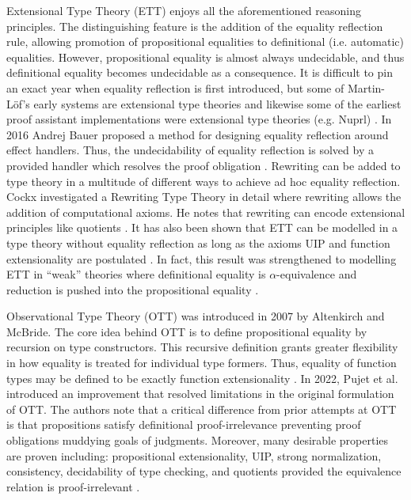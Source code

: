 Extensional Type Theory (ETT) enjoys all the aforementioned reasoning principles.
The distinguishing feature is the addition of the equality reflection rule, allowing promotion of propositional equalities to definitional (i.e. automatic) equalities.
However, propositional equality is almost always undecidable, and thus definitional equality becomes undecidable as a consequence.
It is difficult to pin an exact year when equality reflection is first introduced, but some of Martin-L\"{o}f's early systems are extensional type theories and likewise some of the earliest proof assistant implementations were extensional type theories (e.g. Nuprl) \cite{constable1986}.
In 2016 Andrej Bauer proposed a method for designing equality reflection around effect handlers.
Thus, the undecidability of equality reflection is solved by a provided handler which resolves the proof obligation \cite{bauer2016}.
Rewriting can be added to type theory in a multitude of different ways to achieve ad hoc equality reflection.
Cockx investigated a Rewriting Type Theory in detail where rewriting allows the addition of computational axioms.
He notes that rewriting can encode extensional principles like quotients \cite{cockx2020, cockx2021}.
It has also been shown that ETT can be modelled in a type theory without equality reflection as long as the axioms UIP and function extensionality are postulated \cite{winterhalter2019}.
In fact, this result was strengthened to modelling ETT in ``weak'' theories where definitional equality is $\alpha$-equivalence and reduction is pushed into the propositional equality \cite{boulier2019}.

Observational Type Theory (OTT) was introduced in 2007 by Altenkirch and McBride.
The core idea behind OTT is to define propositional equality by recursion on type constructors.
This recursive definition grants greater flexibility in how equality is treated for individual type formers.
Thus, equality of function types may be defined to be exactly function extensionality \cite{altenkirch2007}.
In 2022, Pujet et al. introduced an improvement that resolved limitations in the original formulation of OTT.
The authors note that a critical difference from prior attempts at OTT is that propositions satisfy definitional proof-irrelevance preventing proof obligations muddying goals of judgments.
Moreover, many desirable properties are proven including: propositional extensionality, UIP, strong normalization, consistency, decidability of type checking, and quotients provided the equivalence relation is proof-irrelevant \cite{pujet2022}.


